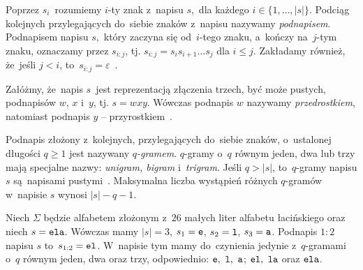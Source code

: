 \documentclass{praca1}
\begin{document}
Poprzez $s_i$~rozumiemy $i$-ty znak z~napisu $s$,~dla każdego $i \in \{1,\ldots,|s|\}$. Podciąg kolejnych przylegających do~siebie znaków z~napisu nazywamy \emph{podnapisem}. Podnapisem napisu $s$,~który zaczyna się od~$i$-tego znaku, a~kończy na~$j$-tym znaku, oznaczamy przez $s_{i:j}$, tj. $s_{i:j} = s_is_{i+1}\ldots s_j$ dla $i \leq j$. Zakładamy również, że~jeśli $j < i$, to~$s_{i:j} = \varepsilon$~\cite{Boytsov2011:indexingmethods,Loo2014:stringdist}.

\begin{definition}
Załóżmy, że~napis $s$~jest reprezentacją złączenia trzech, być może pustych, podnapisów $w$, $x$ i~$y$, tj. $s = wxy$. Wówczas podnapis $w$ nazywamy \emph{przedrostkiem}, natomiast podnapis $y$ -- przyrostkiem~\cite{Boytsov2011:indexingmethods}.
\end{definition}

\begin{definition}
Podnapis złożony z~kolejnych, przylegających do~siebie znaków, o~ustalonej długości $q\geq 1$ jest nazywany \emph{$q$-gramem}. $q$-gramy o~$q$ równym jeden, dwa lub trzy mają specjalne nazwy: \emph{unigram, bigram} i~\emph{trigram}. Jeśli $q > |s|$, to~$q$-gramy napisu $s$ są~napisami pustymi~\cite{Boytsov2011:indexingmethods}. Maksymalna liczba wystąpień różnych $q$-gramów w~napisie $s$ wynosi $|s|-q-1$.
\end{definition}



\begin{example}
Niech $\Sigma$ będzie alfabetem złożonym z~$26$ małych liter alfabetu łacińskiego oraz niech $s = \verb|ela|$. Wówczas mamy $|s| = 3$, $s_1 = \verb|e|$, $s_2 = \verb|l|$, $s_3 = \verb|a|$. Podnapis $1\!\!:\!\!2$ napisu $s$ to~$s_{1:2} = \verb|el|$. W~napisie tym mamy do~czynienia jedynie z~$q$-gramami o~$q$ równym jeden, dwa oraz trzy, odpowiednio: $\verb|e|,\ \verb|l|,\ \verb|a|$; $\verb|el|,\ \verb|la|$ oraz $\verb|ela|$.
\end{example}
\end{document}
